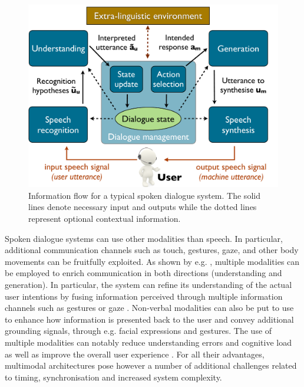 \begin{figure}[h]
\centering
\vspace{5mm}
\includegraphics[scale=0.30]{imgs/architecture.pdf}
\vspace{5mm}
\caption{Information flow for a typical spoken dialogue system. The solid lines denote necessary input and outputs while the dotted lines represent optional contextual information.}
\label{fig:architecture}
\end{figure}

Spoken dialogue systems can use other modalities than speech.  In particular, additional communication channels such as touch, gestures, gaze, and other body movements can be fruitfully exploited.  As shown by e.g. \cite{smartkom}, multiple modalities can be employed to enrich communication in both directions (understanding and generation). In particular, the system can refine its understanding of the actual user intentions by fusing information perceived through multiple information channels such as gestures \citep{stiefelhagen2004} or gaze \citep{koller2012}.  Non-verbal modalities can also be put to use to enhance how information is presented back to the user and convey additional grounding signals, through e.g. facial expressions and gestures. The use of multiple modalities can notably reduce understanding errors and cognitive load \citep{oviatt2004we} as well as improve the overall user experience \citep{JokinenH06}.  For all their advantages, multimodal architectures pose however a number of additional challenges related to timing, synchronisation \citep{DBLP:conf/hri/SalemKJ13} and increased system complexity. 

